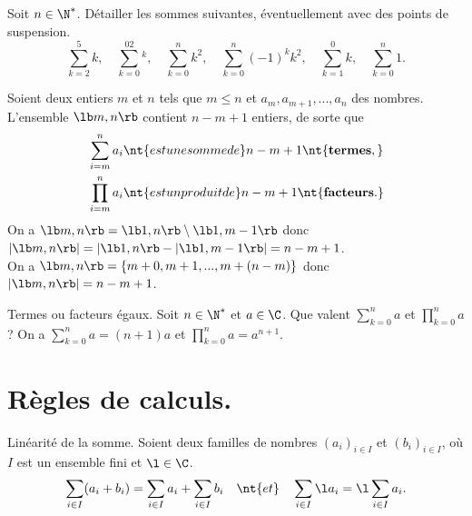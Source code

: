 \documentclass[11pt]{article}
\begin{document}
\setcounter{tcb@cnt@thm}{1}

\begin{ex}{}{}
    Soit $n\in\N^*$. Détailler les sommes suivantes, éventuellement avec des points de suspension.
    \begin{equation*}
        \sum_{k=2}^{5}k,\quad\sum_{k=0}^02^k,\quad\sum_{k=0}^nk^2,\quad\sum_{k=0}^n(-1)^kk^2,\quad\sum_{k=1}^0k,\quad\sum_{k=0}^n1.
    \end{equation*}
\end{ex}


\begin{prop}{}{}
    Soient deux entiers $m$ et $n$ tels que $m\leq n$ et $a_m,a_{m+1},...,a_n$ des nombres.\\
    L'ensemble $\lb m,n\rb$ contient $n-m+1$ entiers, de sorte que
    \begin{equation*}
        \begin{aligned}
            &\sum_{i=m}^na_i \nt{ est une somme de } n-m+1 \nt{ \bf{termes},}\\
            &\prod_{i=m}^na_i \nt{ est un produit de } n-m+1 \nt{ \bf{facteurs}.}
        \end{aligned}
    \end{equation*}
    \tcblower
    On a $\lb m,n \rb = \lb 1, n \rb \setminus \lb 1, m-1\rb$ donc $|\lb m,n\rb|=|\lb1,n\rb - |\lb1,m-1\rb|=n-m+1$.\\
    On a $\lb m,n\rb = \{m+0, m+1, ..., m + (n-m)\}$ donc $|\lb m,n \rb|=n-m+1$.
\end{prop}

\begin{ex}{Termes ou facteurs égaux.}{}
    Soit $n\in\N^*$ et $a\in\C$. Que valent $\sum\limits_{k=0}^na$ et $\prod\limits_{k=0}^na$ ?
    \tcblower
    On a $\sum\limits_{k=0}^na=(n+1)a$ et $\prod\limits_{k=0}^na=a^{n+1}$.
\end{ex}

\section{Règles de calculs.}

\begin{prop}{Linéarité de la somme.}{}
    Soient deux familles de nombres $(a_i)_{i\in I}$ et $(b_i)_{i\in I}$, où $I$ est un ensemble fini et $\l\in\C$.
    \begin{equation*}
        \sum_{i\in I}(a_i+b_i)=\sum_{i\in I}a_i+\sum_{i\in I}b_i\quad\nt{et}\quad\sum_{i\in I}\l a_i=\l\sum_{i\in I}a_i.
    \end{equation*}
\end{prop}
\end{document}
